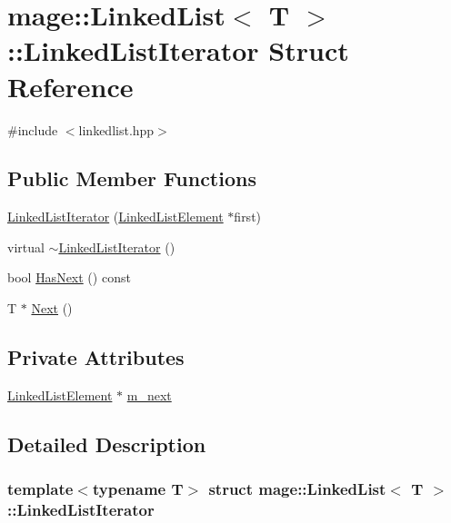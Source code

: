 \hypertarget{structmage_1_1_linked_list_1_1_linked_list_iterator}{}\section{mage\+:\+:Linked\+List$<$ T $>$\+:\+:Linked\+List\+Iterator Struct Reference}
\label{structmage_1_1_linked_list_1_1_linked_list_iterator}


{\ttfamily \#include $<$linkedlist.\+hpp$>$}

\subsection*{Public Member Functions}
\begin{DoxyCompactItemize}
\item 
\hyperlink{structmage_1_1_linked_list_1_1_linked_list_iterator_a23efb79b0ab097c9d238feca8bab6e42}{Linked\+List\+Iterator} (\hyperlink{structmage_1_1_linked_list_1_1_linked_list_element}{Linked\+List\+Element} $\ast$first)
\item 
virtual \hyperlink{structmage_1_1_linked_list_1_1_linked_list_iterator_a16631a6dc7aaaad10ba676f569da62b9}{$\sim$\+Linked\+List\+Iterator} ()
\item 
bool \hyperlink{structmage_1_1_linked_list_1_1_linked_list_iterator_ae23127f7be560d81bbda5321690a7ef9}{Has\+Next} () const
\item 
T $\ast$ \hyperlink{structmage_1_1_linked_list_1_1_linked_list_iterator_aaffb4ff395841103f65d09b2784ad61f}{Next} ()
\end{DoxyCompactItemize}
\subsection*{Private Attributes}
\begin{DoxyCompactItemize}
\item 
\hyperlink{structmage_1_1_linked_list_1_1_linked_list_element}{Linked\+List\+Element} $\ast$ \hyperlink{structmage_1_1_linked_list_1_1_linked_list_iterator_a2936c8e80e5ef746150a8a93ef1300cb}{m\+\_\+next}
\end{DoxyCompactItemize}


\subsection{Detailed Description}
\subsubsection*{template$<$typename T$>$\newline
struct mage\+::\+Linked\+List$<$ T $>$\+::\+Linked\+List\+Iterator}


